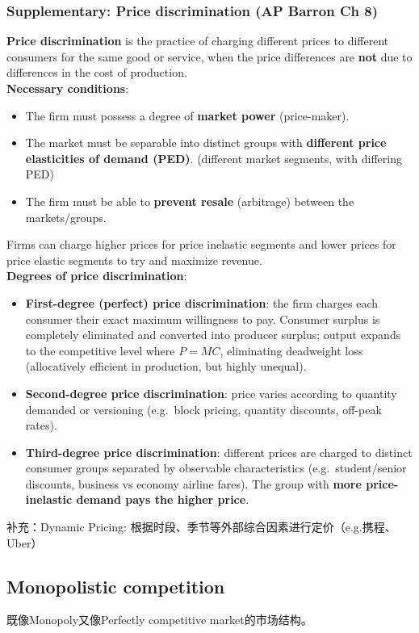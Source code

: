 \documentclass[a4paper,12pt]{article}
\newcommand{\needbold}[1]{\textcolor{red!70!black}{\textbf{#1}}}
\begin{document}
\subsubsection*{Supplementary: Price discrimination (AP Barron Ch 8)}
\needbold{Price discrimination} is the practice of charging different prices to different consumers for the same good or service, when the price differences are \textbf{not} due to differences in the cost of production.
\\\textbf{Necessary conditions}:
\begin{itemize}
  \item The firm must possess a degree of \textbf{market power} (price-maker).
  \item The market must be separable into distinct groups with \textbf{different price elasticities of demand (PED)}. (different market segments, with differing PED)
  \item The firm must be able to \textbf{prevent resale} (arbitrage) between the markets/groups.
\end{itemize}
Firms can charge higher prices for price inelastic segments and lower prices for price elastic segments to try and maximize revenue.\\
\textbf{Degrees of price discrimination}:
\begin{itemize}
  \item \textbf{First-degree (perfect) price discrimination}: the firm charges each consumer their exact maximum willingness to pay. Consumer surplus is completely eliminated and converted into producer surplus; output expands to the competitive level where $P = MC$, eliminating deadweight loss (allocatively efficient in production, but highly unequal).
  \item \textbf{Second-degree price discrimination}: price varies according to quantity demanded or versioning (e.g.\ block pricing, quantity discounts, off-peak rates).
  \item \textbf{Third-degree price discrimination}: different prices are charged to distinct consumer groups separated by observable characteristics (e.g.\ student/senior discounts, business vs economy airline fares). The group with \textbf{more price-inelastic demand pays the higher price}.
\end{itemize}
补充：Dynamic Pricing: 根据时段、季节等外部综合因素进行定价（e.g.携程、Uber）
\subsection{Monopolistic competition}
既像Monopoly又像Perfectly competitive market的市场结构。
\end{document}
